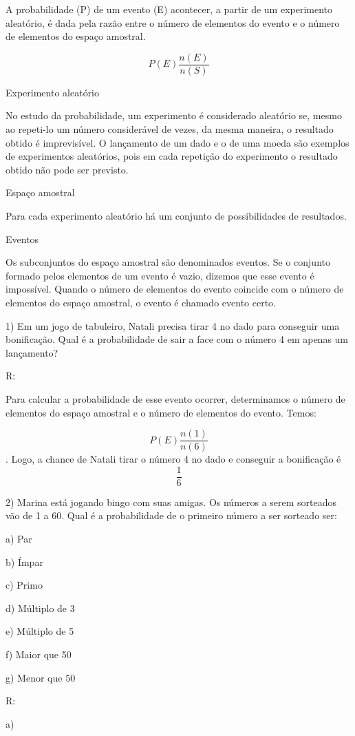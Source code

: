 A probabilidade (P) de um evento (E) acontecer, a partir de um
experimento aleatório, é dada pela razão entre o número de elementos do
evento e o número de elementos do espaço amostral.

\[P(E)\frac{n(E)}{n(S)}\]

Experimento aleatório

No estudo da probabilidade, um experimento é considerado aleatório se,
mesmo ao repeti-lo um número considerável de vezes, da mesma maneira, o
resultado obtido é imprevisível. O lançamento de um dado e o de uma
moeda são exemplos de experimentos aleatórios, pois em cada repetição do
experimento o resultado obtido não pode ser previsto.

Espaço amostral

Para cada experimento aleatório há um conjunto de possibilidades de
resultados.

Eventos

Os subconjuntos do espaço amostral são denominados eventos. Se o
conjunto formado pelos elementos de um evento é vazio, dizemos que esse
evento é impossível. Quando o número de elementos do evento coincide com
o número de elementos do espaço amostral, o evento é chamado evento
certo.


1) Em um jogo de tabuleiro, Natali precisa tirar 4 no dado para
conseguir uma bonificação. Qual é a probabilidade de sair a face com o
número 4 em apenas um lançamento?

R:

Para calcular a probabilidade de esse evento ocorrer, determinamos o
número de elementos do espaço amostral e o número de elementos do
evento. Temos:

\[P(E)\frac{n(1)}{n(6)}\]. Logo, a chance de Natali tirar o número 4 no
dado e conseguir a bonificação é \[\frac{1}{6}\]

2) Marina está jogando bingo com suas amigas. Os números a serem
sorteados vão de 1 a 60. Qual é a probabilidade de o primeiro número a
ser sorteado ser:

a) Par

b) Ímpar

c) Primo

d) Múltiplo de 3

e) Múltiplo de 5

f) Maior que 50

g) Menor que 50

R:

a)

